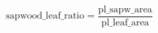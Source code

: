 \documentclass[preview,border=2pt]{standalone}
\begin{document}
\[
\mathrm{sapwood\_leaf\_ratio} = \dfrac{\mathrm{pl\_sapw\_area}}{\mathrm{pl\_leaf\_area}}
\]
\end{document}
